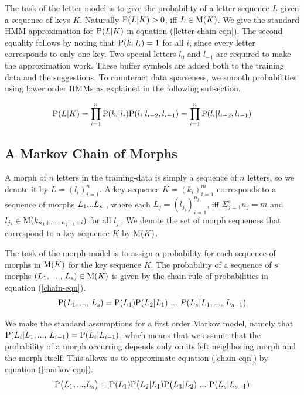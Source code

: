 \documentclass{llncs}
\begin{document}
The task of the letter model is to give the probability of a letter
sequence $L$ given a sequence of keys $K$. Naturally ${\rm P}(L|K) >
0$, iff $L \in {\rm M}(K)$. We give the standard HMM approximation for
${\rm P}(L|K)$ in equation (\ref{letter-chain-eqn}).  The second
equality follows by noting that ${\rm P}(k_i|l_i) = 1$ for all $i$,
since every letter corresponds to only one key. Two special letters
$l_{0}$ and $l_{-1}$ are required to make the approximation work. These
buffer symbols are added both to the training data and the
suggestions. To counteract data sparseness, we smooth probabilities
using lower order HMMs as explained in the following subsection.

\begin{equation}\label{letter-chain-eqn}
{\rm P}(L|K) = \prod_{i=1}^{n}{\rm P}(k_i|l_i){\rm P}(l_i|l_{i-2},l_{i-1}) = \prod_{i=1}^{n}{\rm P}(l_i|l_{i-2},l_{i-1})
\end{equation}

\subsection{A Markov Chain of Morphs}

A morph of $n$ letters in the training-data is simply a sequence of $n$
letters, so we denote it by $L = (l_i)_{i=1}^{n}$. A key sequence $K =
(k_i)_{i=1}^{m}$ corresponds to a sequence of morphs $L_1{\rm
  ... }L_s$ , where each $L_j = (l_{j_i})_{i=1}^{n_j}$, iff $\Sigma_{j
  = 1}^{s} n_j = m$ and $l_{j_i} \in {\rm M}(k_{n_1 + {\rm ... } +
  n_{j - 1} + i})$ for all $l_{j_i}$. We denote the set of morph
sequences that correspond to a key sequence $K$ by ${\rm M}(K)$.

The task of the morph model is to assign a probability for each
sequence of morphs in ${\rm M}(K)$ for the key sequence $K$. The
probability of a sequence of $s$ morphs $(L_1{\rm,\ ...,\ }L_s) \in {\rm M}(K)$
is given by the chain rule of probabilities in equation
(\ref{chain-eqn}).
\begin{equation}\label{chain-eqn}
{\rm P}(L_1{\rm, ..., }\ L_s) = {\rm P}(L_1){\rm P}(L_2|L_1)\ {\rm
  ... }\ P(L_s| L_1{\rm, ..., }\ L_{s - 1})
\end{equation}

We make the standard assumptions for a first order Markov model,
namely that ${\rm P}(L_i | L_1{\rm, ..., }\ L_{i-1}) = {\rm P}(L_i |
L_{i-1})$, which means that we assume that the probability of a morph
occurring depends only on its left neighboring morph and the morph
itself. This allows us to approximate equation (\ref{chain-eqn}) by
equation (\ref{markov-eqn}).
\begin{equation}\label{markov-eqn}
{\rm P}\big(L_1{\rm, ..., }L_s\big) = {\rm P}(L_1){\rm P}\big(L_2 |
L_1){\rm P}\big(L_3 | L_2)\ {\rm ... }\ {\rm P}(L_{s} | L_{s-1})
\end{equation}
\end{document}
